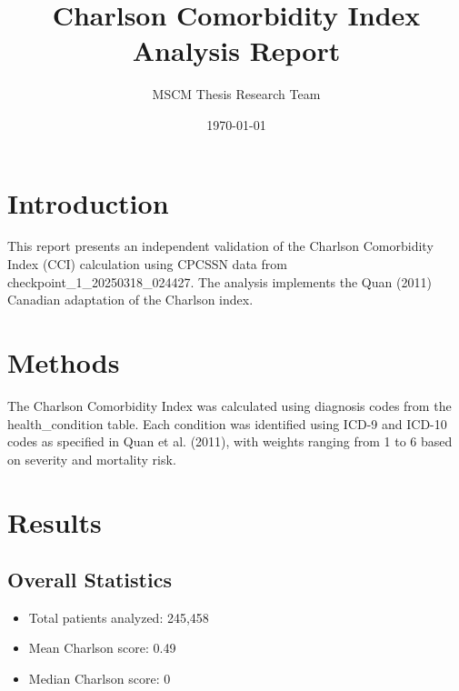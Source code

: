 \documentclass{article}
\title{Charlson Comorbidity Index Analysis Report}
\author{MSCM Thesis Research Team}
\date{\today}
\begin{document}
\maketitle

\section{Introduction}
This report presents an independent validation of the Charlson Comorbidity Index (CCI) calculation
using CPCSSN data from checkpoint\_1\_20250318\_024427. The analysis implements the Quan (2011)
Canadian adaptation of the Charlson index.

\section{Methods}
The Charlson Comorbidity Index was calculated using diagnosis codes from the health\_condition
table. Each condition was identified using ICD-9 and ICD-10 codes as specified in Quan et al. (2011),
with weights ranging from 1 to 6 based on severity and mortality risk.

\section{Results}
\subsection{Overall Statistics}
\begin{itemize}
\item Total patients analyzed: 245,458
\item Mean Charlson score: 0.49
\item Median Charlson score: 0
\end{itemize}
\end{document}

